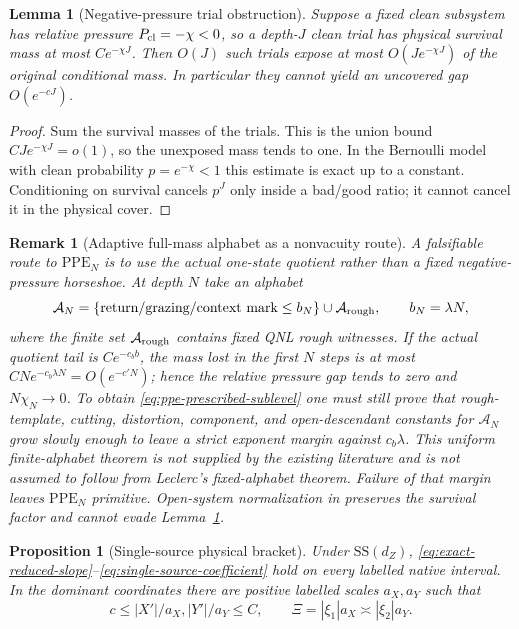 \documentclass[11pt]{article}
\newtheorem{proposition}[theorem]{Proposition}
\newtheorem{lemma}[theorem]{Lemma}
\newtheorem{remark}[theorem]{Remark}
\begin{document}
\begin{lemma}[Negative-pressure trial obstruction]
\label{lem:negative-pressure-trial-obstruction}
Suppose a fixed clean subsystem has relative pressure
$P_{\rm cl}=-\chi<0$, so a depth-$J$ clean trial has physical survival mass
at most $Ce^{-\chi J}$.  Then $O(J)$ such trials expose at most
$O(Je^{-\chi J})$ of the original conditional mass.  In particular they
cannot yield an uncovered gap $O(e^{-cJ})$.
\end{lemma}

\begin{proof}
Sum the survival masses of the trials.  This is the union bound
$CJ e^{-\chi J}=o(1)$, so the unexposed mass tends to one.  In the Bernoulli
model with clean probability $p=e^{-\chi}<1$ this estimate is exact up to a
constant.  Conditioning on survival cancels $p^J$ only inside a bad/good
ratio; it cannot cancel it in the physical cover.
\end{proof}

\begin{remark}[Adaptive full-mass alphabet as a nonvacuity route]
\label{rem:high-pressure-clean-route}
A falsifiable route to $\mathrm{PPE}_{N}$ is to use the actual one-state
quotient rather than a fixed negative-pressure horseshoe.  At depth $N$ take
an alphabet
\[
 \mathcal A_N=\{\text{return/grazing/context mark}\le b_N\}
 \cup\mathcal A_{\rm rough},\qquad b_N=\lambda N,
\]
where the finite set $\mathcal A_{\rm rough}$ contains fixed QNL rough
witnesses.  If the actual quotient tail is $Ce^{-c_b b}$, the mass lost in
the first $N$ steps is at most
$CN e^{-c_b\lambda N}=O(e^{-c'N})$; hence the relative pressure gap tends to
zero and $N\chi_N\to0$.  To obtain \eqref{eq:ppe-prescribed-sublevel} one
must still prove that rough-template, cutting, distortion, component, and
open-descendant constants for $\mathcal A_N$ grow slowly enough to leave a
strict exponent margin against $c_b\lambda$.  This uniform finite-alphabet
theorem is not supplied by the existing literature and is not assumed to
follow from Leclerc's fixed-alphabet theorem.  Failure of that margin leaves
$\mathrm{PPE}_{N}$ primitive.  Open-system normalization in
\cite{CanestrariHoles,DLreview} preserves the survival factor and cannot
evade Lemma~\ref{lem:negative-pressure-trial-obstruction}.
\end{remark}

\begin{proposition}[Single-source physical bracket]
\label{prop:exact-reduced-slope}
Under $\mathrm{SS}(d_Z)$,
\eqref{eq:exact-reduced-slope}--\eqref{eq:single-source-coefficient} hold on
every labelled native interval.  In the dominant coordinates there are
positive labelled scales $a_X,a_Y$ such that
\begin{equation}
\label{eq:dominant-coordinate-normalization}
 c\le |X'|/a_X,|Y'|/a_Y\le C,
 \qquad \Xi=|\xi_1|a_X\asymp|\xi_2|a_Y.
\end{equation}
\end{proposition}
\end{document}
